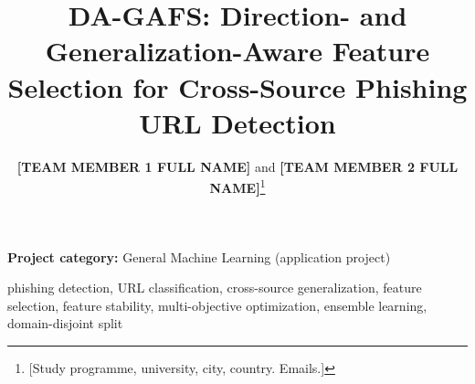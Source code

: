 \documentclass[journal]{IEEEtran}
\begin{document}
\title{DA-GAFS: Direction- and Generalization-Aware Feature Selection for Cross-Source Phishing URL Detection}

\author{\textbf{[TEAM MEMBER 1 FULL NAME]} and \textbf{[TEAM MEMBER 2 FULL NAME]}\thanks{[Study programme, university, city, country. Emails.]}}

\maketitle
\begin{center}\small\textbf{Project category:} General Machine Learning (application project)\end{center}



\begin{IEEEkeywords}
phishing detection, URL classification, cross-source generalization, feature selection, feature stability, multi-objective optimization, ensemble learning, domain-disjoint split
\end{IEEEkeywords}











\end{document}
